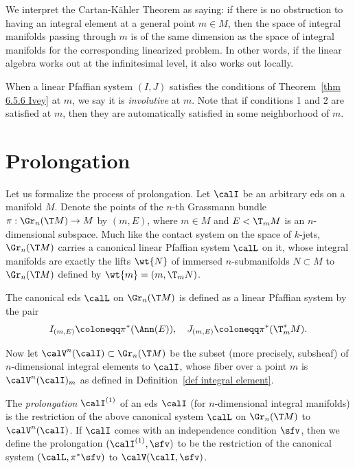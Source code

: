 We interpret the Cartan-K\"ahler Theorem as saying: if there is no obstruction to having an integral element at a general point $m\in M$, then the space of integral manifolds passing through $m$ is of the same dimension as the space of integral manifolds for the corresponding linearized problem. In other words, if the linear algebra works out at the infinitesimal level, it also works out locally.

When a linear Pfaffian system $(I,J)$ satisfies the conditions of Theorem~\ref{thm 6.5.6 Ivey} at $m$, we say it is \emph{involutive} at $m$. Note that if conditions 1 and 2 are satisfied at $m$, then they are automatically satisfied in some neighborhood of $m$.






\section{Prolongation}

Let us formalize the process of prolongation. Let $\calI$ be an arbitrary \gls{eds} on a manifold $M$. Denote the points of the $n$-th Grassmann bundle $\pi:\Gr_n(\T M)\to M$ by $(m,E)$, where $m\in M$ and $E<\T_mM$ is an $n$-dimensional subspace. Much like the contact system on the space of $k$-jets, $\Gr_n(\T M)$ carries a canonical linear Pfaffian system $\calL$ on it, whose integral manifolds are exactly the lifts $\wt{N}$ of immersed $n$-submanifolds $N\subset M$ to $\Gr_n(\T M)$ defined by $\wt{m}=(m,\T_m N)$.

\begin{defn}
    The canonical \gls{eds} $\calL$ on $\Gr_n(\T M)$ is defined as a linear Pfaffian system by the pair
    \[I_{(m,E)}\coloneqq \pi^\ast(\Ann (E)),\quad J_{(m,E)}\coloneqq \pi^\ast(\T_m^\ast M).\]
\end{defn}
Now let $\calV^n(\calI)\subset \Gr_n(\T M)$ be the subset (more precisely, subsheaf) of $n$-dimensional integral elements to $\calI$, whose fiber over a point $m$ is $\calV^n(\calI)_m$ as defined in Definition~\ref{def integral element}.

\begin{defn}
    The \emph{prolongation} $\calI^{(1)}$ of an \gls{eds} $\calI$ (for $n$-dimensional integral manifolds) is the restriction of the above canonical system $\calL$ on $\Gr_n(\T M)$ to $\calV^n(\calI)$. If $\calI$ comes with an independence condition $\sfv$, then we define the prolongation $(\calI^{(1)},\sfv)$ to be the restriction of the canonical system $(\calL,\pi^\ast\sfv)$ to $\calV(\calI,\sfv)$.
\end{defn}

